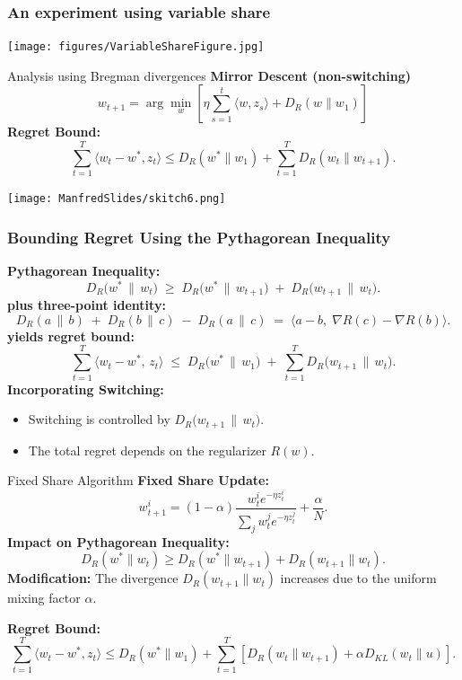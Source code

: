 \documentclass{beamer}
\begin{document}
\begin{small}
\begin{frame}
\frametitle{An experiment using variable share}
\texttt{[image: figures/VariableShareFigure.jpg]}
\end{frame}

\begin{frame}{Analysis using Bregman divergences}  
\textbf{Mirror Descent (non-switching)}
\[
w_{t+1} = \arg\min_{w} \left[ \eta \sum_{s=1}^{t} \langle w, z_s \rangle + D_R(w \| w_1) \right]
\]
\textbf{Regret Bound:}  
\[
\sum_{t=1}^{T} \langle w_t - w^*, z_t \rangle \leq D_R(w^* \| w_1) + \sum_{t=1}^{T} D_R(w_t \| w_{t+1}).
\]
\end{frame}

\texttt{[image: ManfredSlides/skitch6.png]}

\begin{frame}
  \frametitle{Bounding Regret Using the Pythagorean Inequality}

  \textbf{Pythagorean Inequality:}
  \[
    D_{R}\bigl(w^* \,\|\, w_t\bigr)
    \;\ge\;
    D_{R}\bigl(w^* \,\|\, w_{t+1}\bigr)
    \;+\;
    D_{R}\bigl(w_{t+1} \,\|\, w_t\bigr).
  \]
  \pause
  \textbf{plus three-point identity:}
  \[
    D_{R}(a\,\|\,b) 
    \;+\; 
    D_{R}(b\,\|\,c)
    \;-\; 
    D_{R}(a\,\|\,c)
    \;=\;
    \langle a - b,\;\nabla R(c) - \nabla R(b)\rangle.
  \]
\pause
  \textbf{yields regret bound:}
  \[
    \sum_{t=1}^{T} \langle w_t - w^*,\, z_t\rangle
    \;\le\;
    D_{R}\bigl(w^* \,\|\, w_1\bigr)
    \;+\;
    \sum_{t=1}^{T} D_{R}\bigl(w_{t+1} \,\|\, w_t\bigr).
  \]
  \pause
  \textbf{Incorporating Switching:}
  \begin{itemize}
    \item Switching is controlled by 
          \(D_{R}\bigl(w_{t+1}\,\|\,w_t\bigr)\).
    \item The total regret depends on the regularizer \(R(w)\).
  \end{itemize}
\end{frame}


\begin{frame}{Fixed Share Algorithm}
\textbf{Fixed Share Update:}  
\[
w_{t+1}^i = (1 - \alpha) \frac{w_t^i e^{-\eta z_t^i}}{\sum_j w_t^j e^{-\eta z_t^j}} + \frac{\alpha}{N}.
\]
\textbf{Impact on Pythagorean Inequality:}
\[
D_R(w^* \| w_t) \geq D_R(w^* \| w_{t+1}) + D_R(w_{t+1} \| w_t).
\]
\textbf{Modification:}  
\textcolor{mathcolor}{The divergence \( D_R(w_{t+1} \| w_t) \) increases due to the uniform mixing factor \( \alpha \).}

\textbf{Regret Bound:}  
\[
\sum_{t=1}^{T} \langle w_t - w^*, z_t \rangle \leq D_R(w^* \| w_1) + \sum_{t=1}^{T} \left[ D_R(w_t \| w_{t+1}) + \alpha D_{KL}(w_t \| u) \right].
\]
\end{frame}


\end{small}
\end{document}
